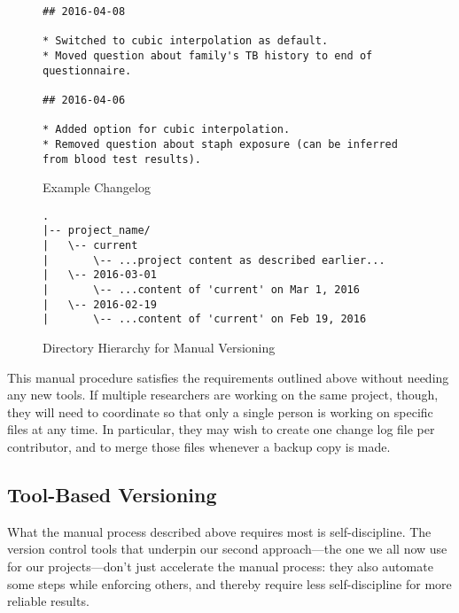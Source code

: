\documentclass[10pt]{article}
\begin{document}
\begin{figure}
\begin{verbatim}
## 2016-04-08

* Switched to cubic interpolation as default.
* Moved question about family's TB history to end of questionnaire.

## 2016-04-06

* Added option for cubic interpolation.
* Removed question about staph exposure (can be inferred from blood test results).
\end{verbatim}
\caption{Example Changelog}
\label{fig:changelog}
\end{figure}

\begin{figure}
\begin{verbatim}
.
|-- project_name/
|   \-- current
|       \-- ...project content as described earlier...
|   \-- 2016-03-01
|       \-- ...content of 'current' on Mar 1, 2016
|   \-- 2016-02-19
|       \-- ...content of 'current' on Feb 19, 2016
\end{verbatim}
\caption{Directory Hierarchy for Manual Versioning}
\label{fig:manual}
\end{figure}

This manual procedure satisfies the requirements outlined above without
needing any new tools. If multiple researchers are working on the same
project, though, they will need to coordinate so that only a single
person is working on specific files at any time. In particular, they may
wish to create one change log file per contributor, and to merge those
files whenever a backup copy is made.

\subsection*{Tool-Based Versioning}

What the manual process described above requires most is
self-discipline. The version control tools that underpin our second
approach---the one we all now use for our projects---don't just
accelerate the manual process: they also automate some steps while
enforcing others, and thereby require less self-discipline for more
reliable results.
\end{document}
